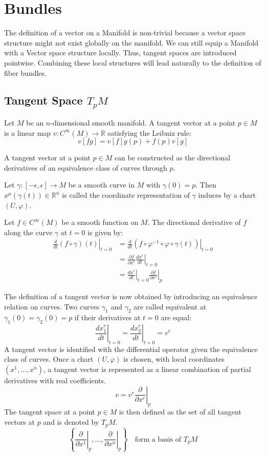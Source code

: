
\chapter{Bundles}

  The definition of a vector on a Manifold is non-trivial because a vector space structure might not exist globally on the manifold. We can still equip a Manifold with a Vector space structure locally. Thus, tangent spaces are introduced pointwise. Combining these local structures will lead naturally to the definition of fiber bundles.

\section{Tangent Space $T_pM$}

  Let $M$ be an $n$-dimensional smooth manifold. A tangent vector at a point $p \in M$ is a linear map $v: C^\infty(M) \to \mathbb{R}$ satisfying the Leibniz rule\cite{FredericSchullerDifferentialstructurespivotalconcepttangentvectorspacesLec09FredericSchuller2015}:
 \[ v[fg] = v[f]g(p) + f(p)v[g] \]

  A tangent vector at a point $p \in M$ can be constructed as the directional derivatives of an equivalence class of curves through $p$\cite{NakaharaGeometrytopologyphysics2005}.

  Let $\gamma: [-\epsilon, \epsilon] \to M$ be a smooth curve in $M$ with $\gamma(0)=p$. Then $x^\mu(\gamma(t)) \in \mathbb{R}^n$ is called the coordinate representation of $\gamma$ induces by a chart $(U, \varphi)$.

Let $f \in C^\infty(M)$ be a smooth function on $M$. The directional derivative of $f$ along the curve $\gamma$ at $t=0$ is given by:
\begin{align*}
\left. \frac{d}{dt} (f \circ \gamma)(t) \right|_{t=0}
  &= \left. \frac{d}{dt} \left( f\circ \varphi^{-1}\circ\varphi\circ\gamma(t) \right) \right|_{t=0} \\
&= \left. \frac{\partial f}{\partial x^r} \frac{d x^r}{dt} \right|_{t=0} \\
&= \left. \frac{d x^r}{dt} \right|_{t=0} \left. \frac{\partial f}{\partial x^r} \right|_p
\end{align*}

The definition of a tangent vector is now obtained by introducing an equivalence relation on curves. Two curves $\gamma_1$ and $\gamma_2$ are called equivalent at $\gamma_1(0)=\gamma_2(0)=p$ if their derivatives at $t=0$ are equal:
\[
\left. \frac{d x_1^r}{dt} \right|_{t=0}
= \left. \frac{d x_2^r}{dt} \right|_{t=0}
= v^r
\]
A tangent vector is identified with the differential operator given the equivalence class of curves. Once a chart $(U, \varphi)$ is chosen, with local coordinates $(x^1, \dots, x^n)$, a tangent vector is represented as a linear combination of partial derivatives with real coefficients.
\[
v = v^r \left. \frac{\partial}{\partial x^r} \right|_p
\]
The tangent space at a point $p \in M$ is then defined as the set of all tangent vectors at $p$ and is denoted by $T_pM$.
\[
\left\{ \left. \frac{\partial}{\partial x^1} \right|_p, \dots, \left. \frac{\partial}{\partial x^n} \right|_p \right\} \quad \text{form a basis of } T_pM
\]



